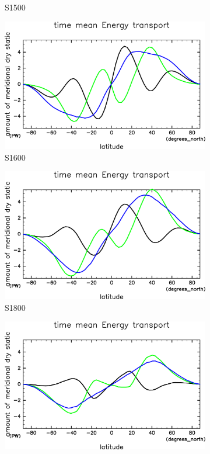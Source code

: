 \documentclass[body]{subfiles}
\begin{document}
\begin{figure}[t]
\begin{subfigure}{.4\textwidth}
		\caption{S1500}\label{EnFlxS1500}
	\end{subfigure}
	\begin{subfigure}{.4\textwidth}
		\centering
		\includegraphics[width=\textwidth]{S1600/EngyFlx,time=3650:4015-crop-rotate.pdf}
		\caption{S1600}\label{EnFlxS1600}
	\end{subfigure}
	\begin{subfigure}{.4\textwidth}
		\centering
		\includegraphics[width=\textwidth]{S1800/EngyFlx,time=3650:4015-crop-rotate.pdf}
		\caption{S1800}\label{EnFlxS1800}
	\end{subfigure}
	\begin{subfigure}{.4\textwidth}
		\centering
		\includegraphics[width=\textwidth]{S2000/EngyFlx,time=7300:7665-crop-rotate.pdf}

\end{subfigure}
\end{figure}
\end{document}
